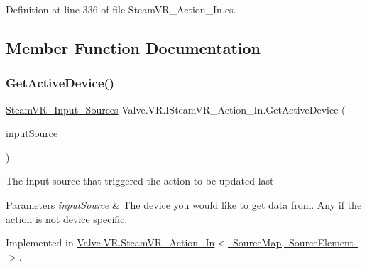 Definition at line 336 of file Steam\+V\+R\+\_\+\+Action\+\_\+\+In.\+cs.



\subsection{Member Function Documentation}
\mbox{\label{interface_valve_1_1_v_r_1_1_i_steam_v_r___action___in_ad0ed3e6765d11920e94e259f6ee6b7c4}} 
\subsubsection{\texorpdfstring{GetActiveDevice()}{GetActiveDevice()}}
{\footnotesize\ttfamily \mbox{\hyperlink{namespace_valve_1_1_v_r_a82e5bf501cc3aa155444ee3f0662853f}{Steam\+V\+R\+\_\+\+Input\+\_\+\+Sources}} Valve.\+V\+R.\+I\+Steam\+V\+R\+\_\+\+Action\+\_\+\+In.\+Get\+Active\+Device (\begin{DoxyParamCaption}\item[{\mbox{\hyperlink{namespace_valve_1_1_v_r_a82e5bf501cc3aa155444ee3f0662853f}{Steam\+V\+R\+\_\+\+Input\+\_\+\+Sources}}}]{input\+Source }\end{DoxyParamCaption})}



The input source that triggered the action to be updated last 


\begin{DoxyParams}{Parameters}
{\em input\+Source} & The device you would like to get data from. Any if the action is not device specific.\\
\hline
\end{DoxyParams}


Implemented in \mbox{\hyperlink{class_valve_1_1_v_r_1_1_steam_v_r___action___in_a2cf3c55c01761a091db3afb42a3d47f2}{Valve.\+V\+R.\+Steam\+V\+R\+\_\+\+Action\+\_\+\+In$<$ Source\+Map, Source\+Element $>$}}.

\mbox{\label{interface_valve_1_1_v_r_1_1_i_steam_v_r___action___in_acfd82f764ece664bc376e638fe440dfd}} 

